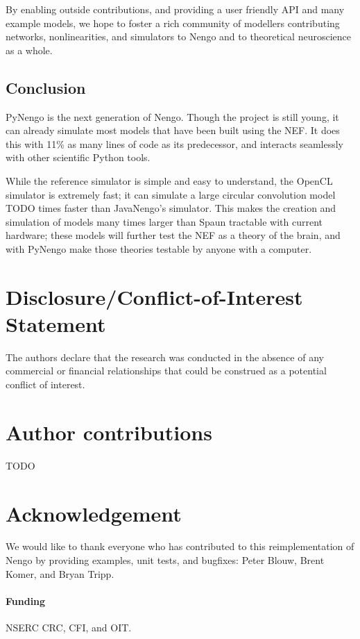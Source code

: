 \documentclass{frontiersSCNS}
\begin{document}
By enabling outside contributions,
and providing a user friendly API
and many example models,
we hope to foster a rich community of modellers
contributing networks, nonlinearities,
and simulators to Nengo
and to theoretical neuroscience
as a whole.

\subsection{Conclusion}

PyNengo is the next generation of Nengo.
Though the project is still young,
it can already simulate most models
that have been built using the NEF.
It does this with 11\% as many lines of code
as its predecessor,
and interacts seamlessly with
other scientific Python tools.

While the reference simulator
is simple and easy to understand,
the OpenCL simulator is extremely fast;
it can simulate a large circular convolution model
TODO times faster than JavaNengo's simulator.
This makes the creation and simulation
of models many times larger than Spaun
tractable with current hardware;
these models will further test
the NEF as a theory of the brain,
and with PyNengo make those theories
testable by anyone with a computer.

\section*{Disclosure/Conflict-of-Interest Statement}

The authors declare that the research was conducted in the absence of
any commercial or financial relationships that could be construed as a
potential conflict of interest.

\section*{Author contributions}

TODO

\section*{Acknowledgement}

We would like to thank
everyone who has contributed
to this reimplementation of Nengo
by providing examples,
unit tests, and bugfixes:
Peter Blouw, Brent Komer, and Bryan Tripp.

\paragraph{Funding\textcolon}
NSERC CRC, CFI, and OIT.



\end{document}
